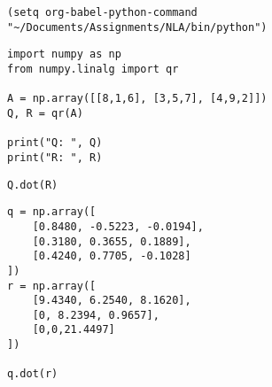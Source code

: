 \documentclass[11pt]{article}
\author{Lokesh Mohanty}
\date{\today}
\title{}
\begin{document}
\tableofcontents

\begin{verbatim}
(setq org-babel-python-command "~/Documents/Assignments/NLA/bin/python")
\end{verbatim}

\begin{verbatim}
import numpy as np
from numpy.linalg import qr

A = np.array([[8,1,6], [3,5,7], [4,9,2]])
Q, R = qr(A)

print("Q: ", Q)
print("R: ", R)
\end{verbatim}

\begin{verbatim}
Q.dot(R)
\end{verbatim}

\begin{verbatim}
q = np.array([
    [0.8480, -0.5223, -0.0194],
    [0.3180, 0.3655, 0.1889],
    [0.4240, 0.7705, -0.1028]
])
r = np.array([
    [9.4340, 6.2540, 8.1620],
    [0, 8.2394, 0.9657],
    [0,0,21.4497]
])

q.dot(r)
\end{verbatim}
\end{document}
